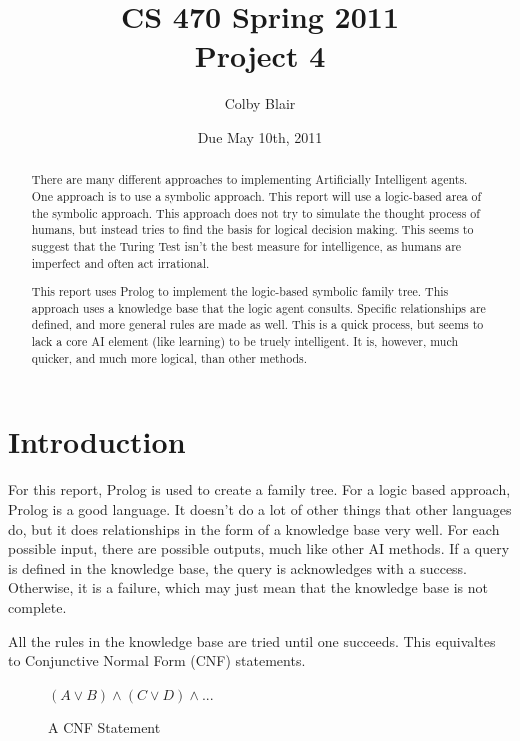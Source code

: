 \documentclass[12pt]{article}
\title{CS 470 Spring 2011 \\
     Project 4}
\author{Colby Blair}
\date{Due May 10th, 2011}
\begin{document}
\maketitle

\begin{abstract}
There are many different approaches to implementing Artificially Intelligent agents. One approach is to use
a symbolic approach. This report will use a logic-based area of the symbolic approach. This approach does
not try to simulate the thought process of humans, but instead tries to find the basis for logical decision
making. This seems to suggest that the Turing Test isn't the best measure for intelligence, as humans 
are imperfect and often act irrational.

This report uses Prolog to implement the logic-based symbolic family tree. This approach uses a knowledge 
base that the logic agent consults. Specific relationships are defined, and more general rules are made as
well. This is a quick process, but seems to lack a core AI element (like learning) to be truely intelligent. It is,
however, much quicker, and much more logical, than other methods.
\end{abstract}

\thispagestyle{empty}

\pagebreak

\thispagestyle{empty}
\tableofcontents
\listoffigures

\pagebreak

\setcounter{page}{1}



\section{Introduction}
For this report, Prolog is used to create a family tree. For a logic based approach, Prolog is a good language. It doesn't do a lot of other things that other languages do, but it does relationships in the form of a knowledge base very well. For each possible input, there are possible outputs, much like other AI methods. If a query is 
defined in the knowledge base, the query is acknowledges with a success. Otherwise, it is a failure, which may just mean that the knowledge base is not complete.

All the rules in the knowledge base are tried until one succeeds. This equivaltes to Conjunctive Normal Form 
(CNF) statements. 

\begin{figure}[h]
        \begin{center}
		$(A \vee B) \wedge (C \vee D) \wedge ...$
                	\caption{A CNF Statement}
                	\label{cnf_ex}
        \end{center}
\end{figure}
\end{document}
